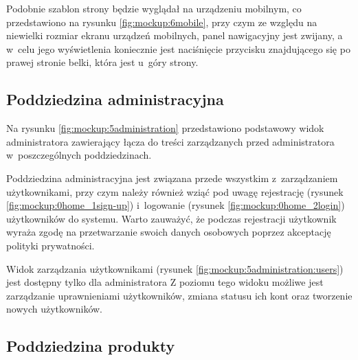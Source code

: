
Podobnie szablon strony będzie wyglądał na urządzeniu mobilnym, co przedstawiono na rysunku \ref{fig:mockup:6mobile},
przy czym ze względu na niewielki rozmiar ekranu urządzeń mobilnych, panel nawigacyjny jest zwijany,
a w~celu jego wyświetlenia koniecznie jest naciśnięcie przycisku znajdującego się po prawej stronie belki, która jest u~góry strony.


\subsection{Poddziedzina administracyjna}

Na rysunku \ref{fig:mockup:5administration} przedstawiono podstawowy widok administratora zawierający łącza do treści zarządzanych przed administratora w~poszczególnych poddziedzinach.


Poddziedzina administracyjna jest związana przede wszystkim z~zarządzaniem użytkownikami,
przy czym należy również wziąć pod uwagę rejestrację (rysunek \ref{fig:mockup:0home_1sign-up}) i~logowanie (rysunek \ref{fig:mockup:0home_2login}) użytkowników do systemu.
Warto zauważyć, że podczas rejestracji użytkownik wyraża zgodę na przetwarzanie swoich danych osobowych poprzez akceptację polityki prywatności.



Widok zarządzania użytkownikami (rysunek \ref{fig:mockup:5administration:users}) jest dostępny tylko dla administratora
Z poziomu tego widoku możliwe jest zarządzanie uprawnieniami użytkowników, zmiana statusu ich kont oraz tworzenie nowych użytkowników.


\subsection{Poddziedzina produkty}

